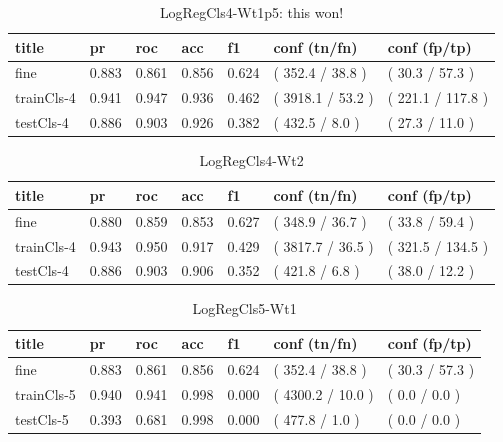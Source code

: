 \documentclass[ms]{nuthesis}
\begin{document}
\FloatBarrier
\begin{table}[H]
\centering
\begin{tabular}{|l||l||l||l||l||l||l|}\toprule
title & pr & roc & acc & f1 & conf (tn/fn) & conf (fp/tp) \\ \midrule
fine & 0.883 & 0.861 & 0.856 & 0.624 & ( 352.4 / 38.8 ) & ( 30.3 / 57.3 ) \\
trainCls-4 & 0.941 & 0.947 & 0.936 & 0.462 & ( 3918.1 / 53.2 ) & ( 221.1 / 117.8 ) \\
testCls-4 & 0.886 & 0.903 & 0.926 & 0.382 & ( 432.5 / 8.0 ) & ( 27.3 / 11.0 ) \\ \bottomrule
\end{tabular}
\caption{LogRegCls4-Wt1p5: this won!}
\label{tab:LogRegCls4-Wt1p5}
\end{table}
\FloatBarrier

\FloatBarrier
\begin{table}[H]
\centering
\begin{tabular}{|l||l||l||l||l||l||l|}\toprule
title & pr & roc & acc & f1 & conf (tn/fn) & conf (fp/tp) \\ \midrule
fine & 0.880 & 0.859 & 0.853 & 0.627 & ( 348.9 / 36.7 ) & ( 33.8 / 59.4 ) \\
trainCls-4 & 0.943 & 0.950 & 0.917 & 0.429 & ( 3817.7 / 36.5 ) & ( 321.5 / 134.5 ) \\
testCls-4 & 0.886 & 0.903 & 0.906 & 0.352 & ( 421.8 / 6.8 ) & ( 38.0 / 12.2 ) \\ \bottomrule
\end{tabular}
\caption{LogRegCls4-Wt2}
\label{tab:LogRegCls4-Wt2}
\end{table}
\FloatBarrier

\FloatBarrier
\begin{table}[H]
\centering
\begin{tabular}{|l||l||l||l||l||l||l|}\toprule
title & pr & roc & acc & f1 & conf (tn/fn) & conf (fp/tp) \\ \midrule
fine & 0.883 & 0.861 & 0.856 & 0.624 & ( 352.4 / 38.8 ) & ( 30.3 / 57.3 ) \\
trainCls-5 & 0.940 & 0.941 & 0.998 & 0.000 & ( 4300.2 / 10.0 ) & ( 0.0 / 0.0 ) \\
testCls-5 & 0.393 & 0.681 & 0.998 & 0.000 & ( 477.8 / 1.0 ) & ( 0.0 / 0.0 ) \\ \bottomrule
\end{tabular}
\caption{LogRegCls5-Wt1}
\label{tab:LogRegCls5-Wt1}
\end{table}
\FloatBarrier
\end{document}
